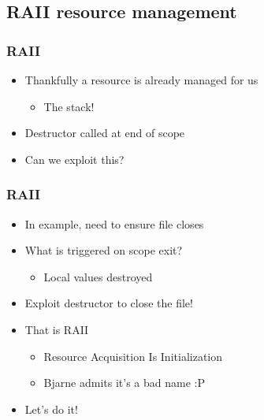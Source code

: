 


\subsection{RAII resource management}
\frame{\subsectionpage}

\begin{frame}
    \frametitle{RAII}
    \begin{itemize}
        \item<1->Thankfully a resource is already managed for us
            \begin{itemize}
                \item<2->The stack!
            \end{itemize}
        \item<2->Destructor called at end of scope
        \item<2->Can we exploit this?
    \end{itemize}
\end{frame}

\begin{frame}
    \frametitle{RAII}
    \begin{itemize}
        \item In example, need to ensure file closes
        \item What is triggered on scope exit?
            \begin{itemize}
                \item Local values destroyed
            \end{itemize}
        \item Exploit destructor to close the file!
        \item That is RAII
            \begin{itemize}
                \item Resource Acquisition Is Initialization
                \item Bjarne admits it's a bad name :P
            \end{itemize}
        \item Let's do it!
    \end{itemize}
\end{frame}

